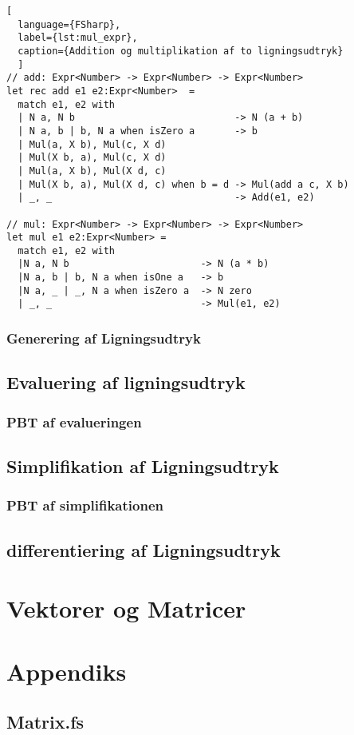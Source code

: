 \documentclass{article}
\begin{document}
\begin{lstlisting}[
  language={FSharp}, 
  label={lst:mul_expr}, 
  caption={Addition og multiplikation af to ligningsudtryk}
  ]
// add: Expr<Number> -> Expr<Number> -> Expr<Number>
let rec add e1 e2:Expr<Number>  =
  match e1, e2 with
  | N a, N b                            -> N (a + b)
  | N a, b | b, N a when isZero a       -> b
  | Mul(a, X b), Mul(c, X d) 
  | Mul(X b, a), Mul(c, X d)
  | Mul(a, X b), Mul(X d, c) 
  | Mul(X b, a), Mul(X d, c) when b = d -> Mul(add a c, X b)  
  | _, _                                -> Add(e1, e2)

// mul: Expr<Number> -> Expr<Number> -> Expr<Number>
let mul e1 e2:Expr<Number> =
  match e1, e2 with
  |N a, N b                       -> N (a * b)
  |N a, b | b, N a when isOne a   -> b
  |N a, _ | _, N a when isZero a  -> N zero
  | _, _                          -> Mul(e1, e2)
\end{lstlisting}


\subsubsection{Generering af Ligningsudtryk}\label{sec:expression_generation}
    
\subsection{Evaluering af ligningsudtryk}
\subsubsection{PBT af evalueringen} %
\subsection{Simplifikation af Ligningsudtryk} \label{sec:simplification_expression}
\subsubsection{PBT af simplifikationen} %

\subsection{differentiering af Ligningsudtryk}

\section{Vektorer og Matricer}


\section{Appendiks}
\subsection{Matrix.fs} \label{sec:matrix.fs}
\newpage
\printbibliography
\end{document}
